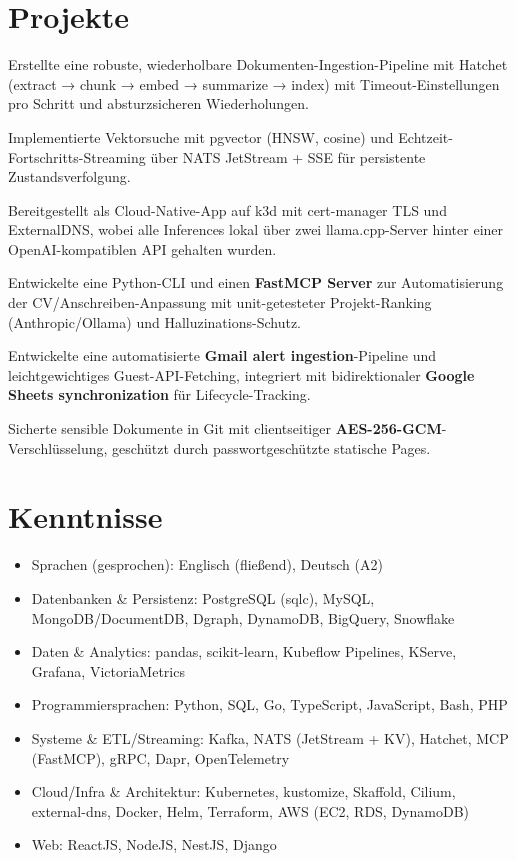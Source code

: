 \documentclass[10pt,a4paper]{resume}
\begin{document}
\section{Projekte}

\bullets
  \item Erstellte eine robuste, wiederholbare Dokumenten-Ingestion-Pipeline mit Hatchet (extract → chunk → embed → summarize → index) mit Timeout-Einstellungen pro Schritt und absturzsicheren Wiederholungen.
  \item Implementierte Vektorsuche mit pgvector (HNSW, cosine) und Echtzeit-Fortschritts-Streaming über NATS JetStream + SSE für persistente Zustandsverfolgung.
  \item Bereitgestellt als Cloud-Native-App auf k3d mit cert-manager TLS und ExternalDNS, wobei alle Inferences lokal über zwei llama.cpp-Server hinter einer OpenAI-kompatiblen API gehalten wurden.
\bulletsend
\vspace{1.0pt}
\bullets
  \item Entwickelte eine Python-CLI und einen \textbf{FastMCP Server} zur Automatisierung der CV/Anschreiben-Anpassung mit unit-getesteter Projekt-Ranking (Anthropic/Ollama) und Halluzinations-Schutz.
  \item Entwickelte eine automatisierte \textbf{Gmail alert ingestion}-Pipeline und leichtgewichtiges Guest-API-Fetching, integriert mit bidirektionaler \textbf{Google Sheets synchronization} für Lifecycle-Tracking.
  \item Sicherte sensible Dokumente in Git mit clientseitiger \textbf{AES-256-GCM}-Verschlüsselung, geschützt durch passwortgeschützte statische Pages.
\bulletsend

\section{Kenntnisse}

\begin{itemize}[leftmargin=1.4em,nosep,topsep=2pt]
  \item Sprachen (gesprochen): Englisch (fließend), Deutsch (A2)
  \item Datenbanken \& Persistenz: PostgreSQL (sqlc), MySQL, MongoDB/DocumentDB, Dgraph, DynamoDB, BigQuery, Snowflake
  \item Daten \& Analytics: pandas, scikit-learn, Kubeflow Pipelines, KServe, Grafana, VictoriaMetrics
  \item Programmiersprachen: Python, SQL, Go, TypeScript, JavaScript, Bash, PHP
  \item Systeme \& ETL/Streaming: Kafka, NATS (JetStream + KV), Hatchet, MCP (FastMCP), gRPC, Dapr, OpenTelemetry
  \item Cloud/Infra \& Architektur: Kubernetes, kustomize, Skaffold, Cilium, external-dns, Docker, Helm, Terraform, AWS (EC2, RDS, DynamoDB)
  \item Web: ReactJS, NodeJS, NestJS, Django
\end{itemize}
\end{document}
